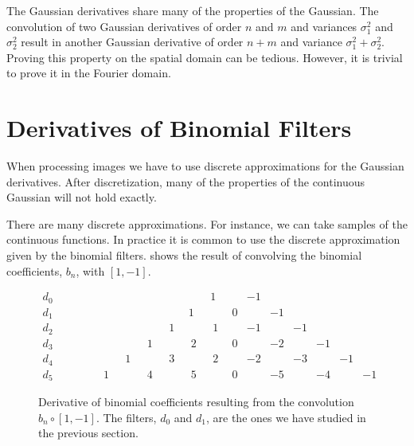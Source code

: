 The Gaussian derivatives share many of the properties of the Gaussian. The convolution of two Gaussian derivatives of order $n$ and $m$ and variances $\sigma_1^2$ and $\sigma_2^2$ result in another Gaussian derivative of order $n+m$ and variance $\sigma_1^2 + \sigma_2^2$. Proving this property on the spatial domain can be tedious. However, it is trivial to prove it in the Fourier domain. 







\section{Derivatives of Binomial Filters}
\label{sec:derivatives_binomial_filters}
When processing images we have to use discrete approximations for the Gaussian derivatives. After discretization, many of the properties of the continuous Gaussian will not hold exactly. 

There are many discrete approximations. For instance, we can take samples of the continuous functions. In practice it is common to use the discrete approximation given by the binomial filters. \Fig{\ref{fig:derivativepascaltriangle}} shows the result of convolving the binomial coefficients, $b_n$, with  $\left[1, -1\right]$.

\begin{figure}[h!]
\centerline{
$\begin{array}{ccccccccccccccccccccl} 
d_0 &    ~ &  ~ & ~ & ~ & ~ & ~ & ~ & ~ & ~~1 & ~~~ & -1 & ~ & ~ & ~ & ~ & ~ & ~ & ~ & ~ &\\
d_1 &    ~ &  ~ & ~ & ~ & ~ & ~ & ~ & ~~1 & ~ & ~~0 & ~ & -1 & ~ & ~ & ~ & ~ & ~ & ~ & ~ & \\
d_2 &    ~ &  ~ & ~ & ~ & ~ & ~ & ~~~1 & ~ & ~~~1 & ~~~ & -1 & ~ & -1 & ~ & ~ & ~ & ~ & ~ & ~ & \\
d_3 &    ~ &  ~ & ~ & ~ & ~ & ~~~1 & ~ & ~~~2 & ~ &  ~~0 & ~~~  & -2 & ~ & -1 & ~ & ~ & ~ & ~ & ~ &\\
d_4 &    ~ &  ~ & ~  & ~ & ~~~1 & ~   & ~~~3   & ~   & ~~~2  &  ~~~  & -2 & ~   & -3   & ~   & -1 & ~ & ~ & ~ & ~ &\\
d_5 &    ~ &  ~ & ~  & ~~~1 & ~ & ~~~4   & ~   & ~~~5 & ~   & ~~0 & ~   & -5 & ~   & -4   & ~ & -1 & ~ & ~ & ~ &
\end{array}$
}
\caption{Derivative of binomial coefficients resulting from the convolution $b_n \circ \left[1, -1\right]$. The filters, $d_0$ and $d_1$, are the ones we have studied in the previous section.} 
\label{fig:derivativepascaltriangle}
\end{figure}

